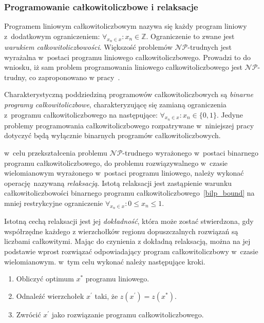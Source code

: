 \subsubsection{\textbf{Programowanie całkowitoliczbowe i relaksacje}}
\label{sss_ilp_relaxations}
\par{
  Programem liniowym całkowitoliczbowym nazywa się każdy program liniowy 
  z~dodatkowym ograniczeniem: $\forall_{x_n \in x}: x_n \in
  \mathbb{Z}\label{ilp_bound}$.
  Ograniczenie to zwane jest \emph{warukiem całkowitoliczbowości}.
  Większość problemów $\mathcal{NP}$-trudnych jest wyrażalna w~postaci programu liniowego
  całkowitoliczbowego.
  Prowadzi to do wniosku, iż sam problem programowania liniowego
  całkowitoliczbowego jest $\mathcal{NP}$-trudny, co zaproponowano w pracy~\cite{Kar72}.
}
\par{  
  Charakterystyczną poddziedziną programowów całkowitoliczbowych są
  \emph{binarne programy całkowitoliczbowe}, charakteryzującę się zamianą
  ograniczenia z~programu całkowitoliczbowego na następujące:
  $\forall_{x_n \in x}: x_n \in \{0, 1\}\label{bilp_bound}$.
  Jedyne problemy programowania całkowitoliczbowego rozpatrywane w~niniejszej
  pracy dotyczyć będą wyłącznie binarnych programów całkowitoliczbowych.
}
\par{
  w~celu przekształcenia problemu $\mathcal{NP}$-trudnego wyrażonego w~postaci binarnego programu całkowitoliczbowego, do problemu rozwiązywalnego w~czasie wielomianowym wyrażonego w~postaci programu liniowego, należy wykonać operację nazywaną \emph{relaksacją}.
  Istotą relaksacji jest zastąpienie warunku całkowitoliczbowości binarnego
  programu całkowitoliczbowego~\eqref{bilp_bound} na mniej restrykcyjne
  ograniczenie $\forall_{x_n\in x}: 0\leq x_n\leq 1$.
}
\par {
  Istotną cechą relaksacji jest jej \emph{dokładność}, która może zostać
  stwierdzona, gdy współrzędne każdego z wierzchołków regionu dopuszczalnych 
  rozwiązań są liczbami całkowitymi.
  Mając do czynienia z dokładną relaksacją, można na jej podstawie wprost 
  rozwiązać odpowiadający program całkowitoliczbowy w~czasie wielomianowym.
  w~tym celu wykonać należy następujące kroki.
  \begin{enumerate}
    \item Obliczyć optimum $x^*$ programu liniowego.
    \item Odnaleźć wierzchołek $x^{\prime}$ taki, że $z(x^{\prime})=z(x^*)$.
    \item Zwrócić $x^{\prime}$ jako rozwiązanie programu całkowitoliczbowego.
  \end{enumerate}
}

